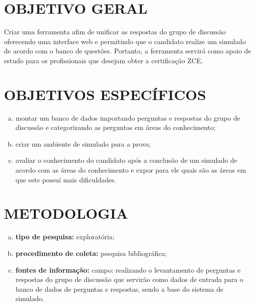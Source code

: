 \section{OBJETIVO GERAL}

Criar uma ferramenta afim de unificar as respostas do grupo de discussão
oferecendo uma interface web e permitindo que o candidato realize um simulado 
de acordo com o banco de questões. Portanto, a ferramenta servirá como apoio de
estudo para os profissionais que desejam obter a certificação \acs{ZCE}.

\section{OBJETIVOS ESPECÍFICOS}

\begin{enumerate}[a)]
    \item montar um banco de dados importando perguntas e respostas do grupo de
    discussão e categorizando as perguntas em áreas do conhecimento;
    \item criar um ambiente de simulado para a prova;
    \item avaliar o conhecimento do candidato após a conclusão de um simulado 
    de acordo com as áreas do conhecimento e expor para ele quais são as áreas  em
    que este possuí mais dificuldades.
\end{enumerate}

\section{METODOLOGIA}

\begin{enumerate}[a)]
    \item \textbf{tipo de pesquisa:} exploratória;
    \item \textbf{procedimento de coleta:} pesquisa bibliográfica;
    \item \textbf{fontes de informação:} campo: realizando o levantamento de
    perguntas e respostas do grupo de discussão que servirão como dados de 
    entrada para o banco de dados de perguntas e respostas, sendo a base do 
    sistema de simulado.
\end{enumerate}